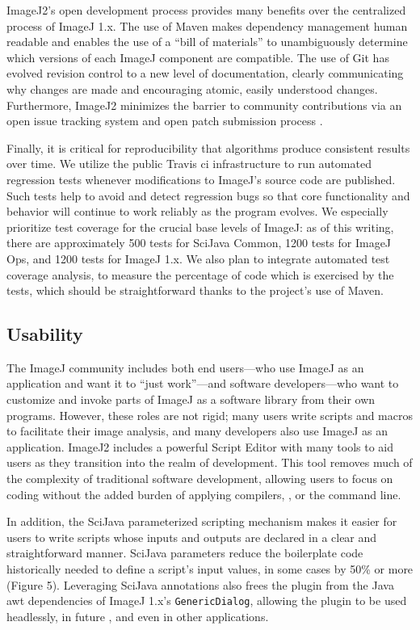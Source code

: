 \documentclass{bmcart}
\begin{document}
ImageJ2's open development process provides many benefits over the centralized
process of ImageJ 1.x. The use of Maven makes dependency management human
readable and enables the use of a ``bill of materials'' to unambiguously
determine which versions of each ImageJ component are compatible. The use of
Git has evolved revision control to a new level of documentation, clearly
communicating why changes are made and encouraging atomic, easily understood
changes. Furthermore, ImageJ2 minimizes the barrier to community contributions
via an open issue tracking system \cite{imagej_issues} and open patch
submission process \cite{imagej_contributing}.

Finally, it is critical for reproducibility that algorithms produce consistent
results over time. We utilize the public Travis \acrfull{ci} infrastructure
\cite{travis_ci} to run automated regression tests whenever modifications to
ImageJ's source code are published. Such tests help to avoid and detect
regression bugs so that core functionality and behavior will continue to work
reliably as the program evolves. We especially prioritize test coverage for
the crucial base levels of ImageJ: as of this writing, there are approximately
500 tests for SciJava Common, 1200 tests for ImageJ Ops, and 1200 tests for
ImageJ 1.x. We also plan to integrate automated test coverage analysis, to
measure the percentage of code which is exercised by the tests, which should be
straightforward thanks to the project's use of Maven.

\subsection*{Usability}

The ImageJ community includes both end users---who use ImageJ as an application
and want it to ``just work''---and software developers---who want to customize
and invoke parts of ImageJ as a software library from their own programs.
However, these roles are not rigid; many users write scripts and macros to
facilitate their image analysis, and many developers also use ImageJ as an
application. ImageJ2 includes a powerful Script Editor with many tools to aid
users as they transition into the realm of development. This tool removes much
of the complexity of traditional software development, allowing users to focus
on coding without the added burden of applying compilers, , or
the command line.

In addition, the SciJava parameterized scripting mechanism makes it easier for
users to write scripts whose inputs and outputs are declared in a clear and
straightforward manner. SciJava parameters reduce the boilerplate code
historically needed to define a script's input values, in some cases by 50\% or
more (Figure 5). Leveraging SciJava annotations also frees the plugin from the
Java \acrshort{awt} dependencies of ImageJ 1.x's \texttt{GenericDialog},
allowing the plugin to be used headlessly, in future , and even
in other applications.
\end{document}
